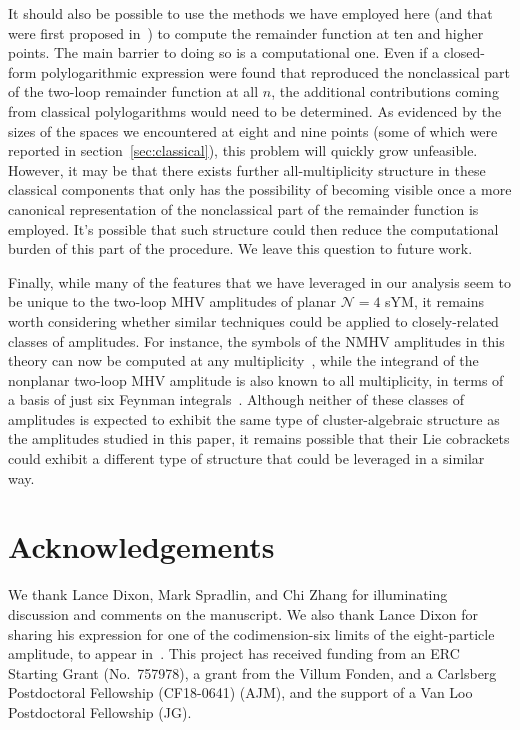 \documentclass[11pt]{article}
\begin{document}
It should also be possible to use the methods we have employed here (and that were first proposed in~\cite{Golden:2014xqf}) to compute the remainder function at ten and higher points. The main barrier to doing so is a computational one. Even if a closed-form polylogarithmic expression were found that reproduced the nonclassical part of the two-loop remainder function at all $n$, the additional contributions coming from classical polylogarithms would need to be determined. As evidenced by the sizes of the spaces we encountered at eight and nine points (some of which were reported in section~\ref{sec:classical}), this problem will quickly grow unfeasible. However, it may be that there exists further all-multiplicity structure in these classical components that only has the possibility of becoming visible once a more canonical representation of the nonclassical part of the remainder function is employed. It's possible that such structure could then reduce the computational burden of this part of the procedure. We leave this question to future work.

Finally, while many of the features that we have leveraged in our analysis seem to be unique to the two-loop MHV amplitudes of planar $\mathcal{N}=4$ sYM, it remains worth considering whether similar techniques could be applied to closely-related classes of amplitudes. For instance, the symbols of the NMHV amplitudes in this theory can now be computed at any multiplicity~\cite{Zhang:2019vnm,He:2020vob}, while the integrand of the nonplanar two-loop MHV amplitude is also known to all multiplicity, in terms of a basis of just six Feynman integrals~\cite{Bourjaily:2019iqr,Bourjaily:2019gqu}. Although neither of these classes of amplitudes is expected to exhibit the same type of cluster-algebraic structure as the amplitudes studied in this paper, it remains possible that their Lie cobrackets could exhibit a different type of structure that could be leveraged in a similar way. 


\section*{Acknowledgements}

We thank Lance Dixon, Mark Spradlin, and Chi Zhang for illuminating discussion and comments on the manuscript. We also thank Lance Dixon for sharing his expression for one of the codimension-six limits of the eight-particle amplitude, to appear in~\cite{Lance_to_appear}. This project has received funding from an ERC Starting Grant \mbox{(No.\ 757978)}, a grant from the Villum Fonden, and a Carlsberg Postdoctoral Fellowship (CF18-0641) (AJM), and the support of a Van Loo Postdoctoral Fellowship (JG).
\end{document}
